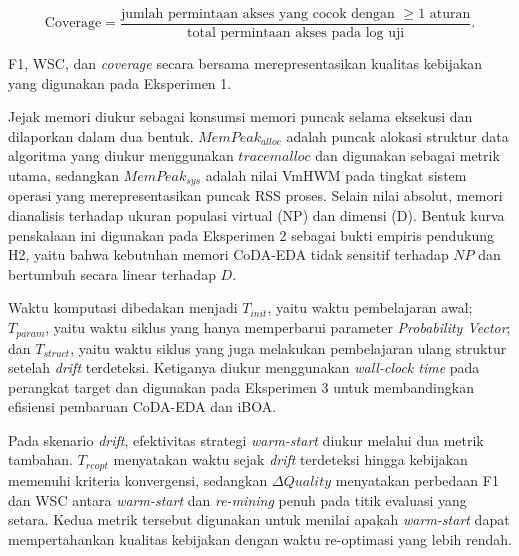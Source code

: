 \[
\mathrm{Coverage} = \frac{\text{jumlah permintaan akses yang cocok dengan }\label{first:coverage} \ge 1 \text{ aturan}}{\text{total permintaan akses pada log uji}}.
\]

F1, WSC, dan \textit{coverage} secara bersama merepresentasikan kualitas kebijakan yang digunakan pada Eksperimen 1.

Jejak memori diukur sebagai konsumsi memori puncak selama eksekusi dan dilaporkan dalam dua bentuk. 
$MemPeak_{alloc}$ adalah puncak alokasi struktur data algoritma yang diukur menggunakan $tracemalloc$ dan digunakan sebagai metrik utama, sedangkan $MemPeak_{sys}$ adalah nilai VmHWM pada tingkat sistem operasi yang merepresentasikan puncak RSS\label{first:rss} proses. 
Selain nilai absolut, memori dianalisis terhadap ukuran populasi virtual (NP) dan dimensi (D). 
Bentuk kurva penskalaan ini digunakan pada Eksperimen 2 sebagai bukti empiris pendukung H2, yaitu bahwa kebutuhan memori CoDA-EDA tidak sensitif terhadap $NP$ dan bertumbuh secara linear terhadap $D$.

Waktu komputasi dibedakan menjadi $T_{init}$\label{first:tinit}, yaitu waktu pembelajaran awal; $T_{param}$\label{first:tparam}, yaitu waktu siklus yang hanya memperbarui parameter \textit{Probability Vector}; dan $T_{struct}$\label{first:tstruct}, yaitu waktu siklus yang juga melakukan pembelajaran ulang struktur setelah \textit{drift} terdeteksi. 
Ketiganya diukur menggunakan \textit{wall-clock time} pada perangkat target dan digunakan pada Eksperimen 3 untuk membandingkan efisiensi pembaruan CoDA-EDA dan iBOA.

Pada skenario \textit{drift}, efektivitas strategi \textit{warm-start} diukur melalui dua metrik tambahan. 
$T_{reopt}$\label{first:treopt} menyatakan waktu sejak \textit{drift} terdeteksi hingga kebijakan memenuhi kriteria konvergensi, sedangkan $\Delta Quality$\label{first:delta-quality} menyatakan perbedaan F1 dan WSC antara \textit{warm-start} dan \textit{re-mining} penuh pada titik evaluasi yang setara. 
Kedua metrik tersebut digunakan untuk menilai apakah \textit{warm-start} dapat mempertahankan kualitas kebijakan dengan waktu re-optimasi yang lebih rendah.

